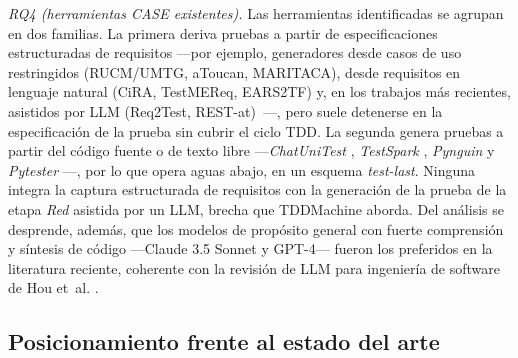 \documentclass[10pt,journal,twoside,letterpaper]{IEEEtran}
\begin{document}
	\textit{RQ4 (herramientas CASE existentes).} Las herramientas identificadas se agrupan en dos familias. La primera deriva pruebas a partir de especificaciones estructuradas de requisitos ---por ejemplo, generadores desde casos de uso restringidos (RUCM/UMTG, aToucan, MARITACA), desde requisitos en lenguaje natural (CiRA, TestMEReq, EARS2TF) y, en los trabajos más recientes, asistidos por LLM (Req2Test, REST-at)~\cite{p003,p011,p016,p022,p026,p029,p031,p038,p039,p048,p053,p056,p064,p065,p067,p069,p071,p072,p078,p084,p088,p098,p100,p103,p104,p106}---, pero suele detenerse en la especificación de la prueba sin cubrir el ciclo TDD. La segunda genera pruebas a partir del código fuente o de texto libre ---\emph{ChatUniTest} \cite{chen2024chatunitest}, \emph{TestSpark} \cite{sapozhnikov2024testspark}, \emph{Pynguin} \cite{lukasczyk2022pynguin} y \emph{Pytester} \cite{takerngsaksiri2025pytester}---, por lo que opera aguas abajo, en un esquema \emph{test-last}. Ninguna integra la captura estructurada de requisitos con la generación de la prueba de la etapa \emph{Red} asistida por un LLM, brecha que TDDMachine aborda. Del análisis se desprende, además, que los modelos de propósito general con fuerte comprensión y síntesis de código ---Claude 3.5 Sonnet y GPT-4--- fueron los preferidos en la literatura reciente, coherente con la revisión de LLM para ingeniería de software de Hou et~al. \cite{hou2024llm4se}.
	
	\subsection{Posicionamiento frente al estado del arte}
	\label{subsec:posicionamiento}
	
\end{document}
